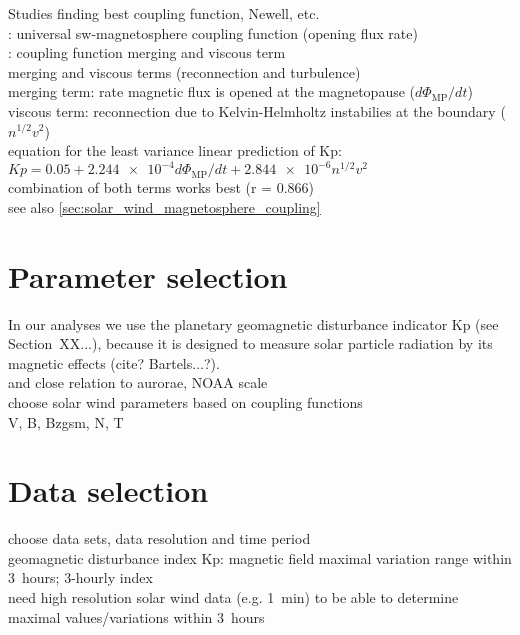 Studies finding best coupling function, Newell, etc.\\

\citet{Newell2007}: universal sw-magnetosphere coupling function (opening flux rate)\\
\citet{Newell2008}: coupling function merging and viscous term\\
merging and viscous terms (reconnection and turbulence)\\
merging term: rate magnetic flux is opened at the magnetopause ($d\Phi_\text{MP}/dt$)\\
viscous term: reconnection due to Kelvin-Helmholtz instabilies at the boundary ($n^{1/2} v^2$)\\
equation for the least variance linear prediction of Kp: $Kp = 0.05 + \num{2.244e-4} d\Phi_\text{MP}/dt + \num{2.844e-6} n^{1/2} v^2$\\
combination of both terms works best (r = 0.866)\\

see also \autoref{sec:solar_wind_magnetosphere_coupling}\\


\section{Parameter selection}

In our analyses we use the planetary geomagnetic disturbance indicator Kp (see Section~XX...), because it is designed to measure solar particle radiation by its magnetic effects (cite? Bartels...?).\\
and close relation to aurorae, NOAA scale\\

choose solar wind parameters based on coupling functions\\
V, B, Bzgsm, N, T\\


\section{Data selection}

choose data sets, data resolution and time period\\

geomagnetic disturbance index Kp: magnetic field maximal variation range within 3~hours; 3-hourly index\\
need high resolution solar wind data (e.g. 1~min) to be able to determine maximal values/variations within 3~hours\\

